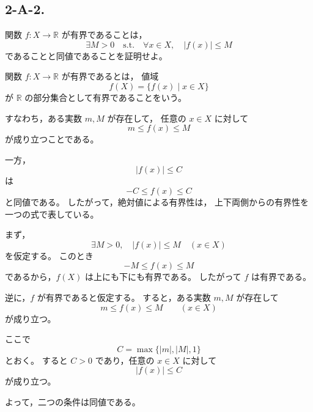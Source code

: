 \subsection{2-A-2.}
\begin{exercise}
	関数 \(f:X\to\mathbb{R}\) が有界であることは，
	\[
	\exists M>0\quad \text{s.t.}\quad
	\forall x\in X,\quad |f(x)|\leq M
	\]
	であることと同値であることを証明せよ。
\end{exercise}

\begin{background}
	関数 \(f:X\to\mathbb{R}\) が有界であるとは，
	値域
	\[
	f(X)=\{f(x)\mid x\in X\}
	\]
	が \(\mathbb{R}\) の部分集合として有界であることをいう。
	
	すなわち，ある実数 \(m,M\) が存在して，
	任意の \(x\in X\) に対して
	\[
	m\leq f(x)\leq M
	\]
	が成り立つことである。
	
	一方，
	\[
	|f(x)|\leq C
	\]
	は
	\[
	-C\leq f(x)\leq C
	\]
	と同値である。
	したがって，絶対値による有界性は，
	上下両側からの有界性を一つの式で表している。
\end{background}

\begin{strategy}
	まず，
	\[
	\exists M>0,\quad |f(x)|\leq M
	\quad (x\in X)
	\]
	を仮定する。
	このとき
	\[
	-M\leq f(x)\leq M
	\]
	であるから，\(f(X)\) は上にも下にも有界である。
	したがって \(f\) は有界である。
	
	逆に，\(f\) が有界であると仮定する。
	すると，ある実数 \(m,M\) が存在して
	\[
	m\leq f(x)\leq M
	\qquad (x\in X)
	\]
	が成り立つ。
	
	ここで
	\[
	C=\max\{|m|,|M|,1\}
	\]
	とおく。
	すると \(C>0\) であり，任意の \(x\in X\) に対して
	\[
	|f(x)|\leq C
	\]
	が成り立つ。
	
	よって，二つの条件は同値である。
\end{strategy}